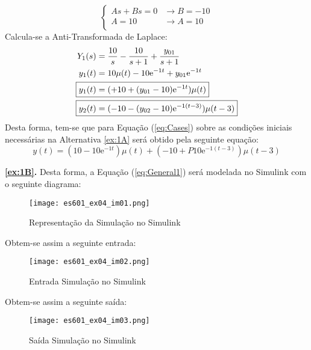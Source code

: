 \documentclass{article}
\begin{document}
\begin{resolution}
\begin{equation*}
\begin{cases}
                            As + Bs = 0 & \rightarrow \boxed{B =-10}\\[1.5mm]
                            A = 10      & \rightarrow \boxed{A = 10}\\
                        \end{cases}
                    \end{equation*}
                Calcula-se a Anti-Transformada de Laplace:
                    \begin{align}
                        Y_{1}(s) &= \frac{10}{s} - \frac{10}{s + 1} + \frac{y_{01}}{s + 1}\nonumber\\
                        y_{1}(t) &= 10\mu(t) - 10\text{e}^{-1t} + y_{01}\text{e}^{-1t}\nonumber\\
                        \Aboxed{y_{1}(t) &=(+10 + (y_{01} - 10)\text{e}^{-1t})\mu(t)}\\
                        \Aboxed{y_{2}(t) &=(-10 - (y_{02} - 10)\text{e}^{-1(t-3)})\mu(t-3)}
                    \end{align}
                Desta forma, tem-se que para Equação (\ref{eq:Cases}) sobre as condições iniciais necessárias na Alternativa \ref{ex:1A} será obtido pela seguinte equação:
                    \begin{equation}
                        \boxed{
                            y(t) = (10 - 10\text{e}^{-1t})\mu(t) + (-10 +P 10\text{e}^{-1(t-3)})\mu(t-3)
                        }\label{eq:General1}
                    \end{equation}
            \end{resolution}
\newpage
            \begin{resolution}
                \textbf{\ref{ex:1B}.} Desta forma, a Equação (\ref{eq:General1}) será modelada no Simulink com o seguinte diagrama:
                    \begin{figure}[H]
                        \centering
                        \texttt{[image: es601\_ex04\_im01.png]}
                        \caption{Representação da Simulação no Simulink}
                    \end{figure}
                Obtem-se assim a seguinte entrada:
                    \begin{figure}[H]
                        \centering
                        \texttt{[image: es601\_ex04\_im02.png]}
                        \caption{Entrada Simulação no Simulink}
                    \end{figure}
                Obtem-se assim a seguinte saída:
                    \begin{figure}[H]
                        \centering
                        \texttt{[image: es601\_ex04\_im03.png]}
                        \caption{Saída Simulação no Simulink}
                    \end{figure}
            \end{resolution}
\end{document}
